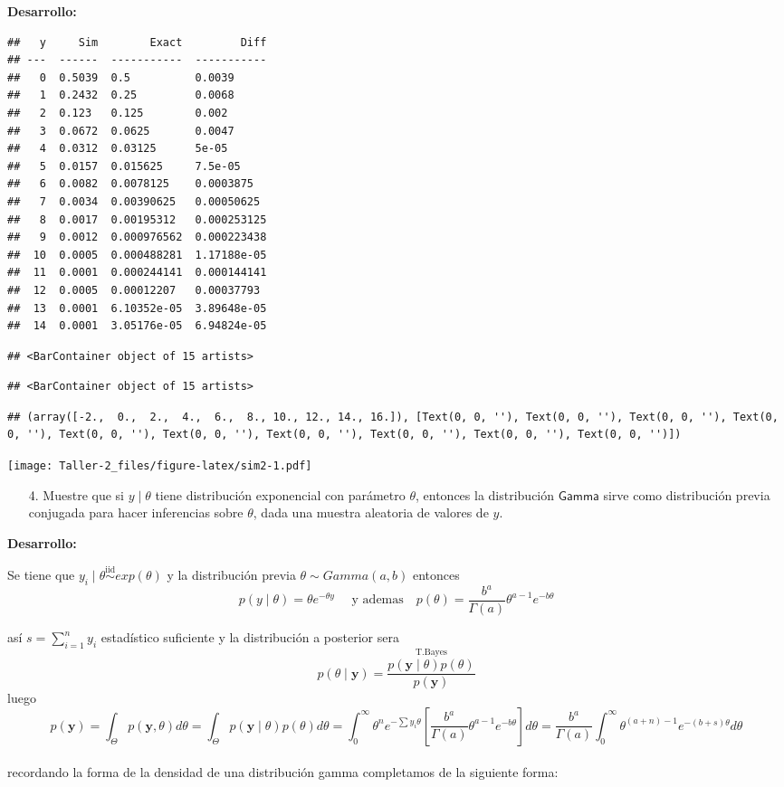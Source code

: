 \documentclass[
]{article}
\begin{document}
\textbf{Desarrollo:}

\begin{verbatim}
##   y     Sim        Exact         Diff
## ---  ------  -----------  -----------
##   0  0.5039  0.5          0.0039
##   1  0.2432  0.25         0.0068
##   2  0.123   0.125        0.002
##   3  0.0672  0.0625       0.0047
##   4  0.0312  0.03125      5e-05
##   5  0.0157  0.015625     7.5e-05
##   6  0.0082  0.0078125    0.0003875
##   7  0.0034  0.00390625   0.00050625
##   8  0.0017  0.00195312   0.000253125
##   9  0.0012  0.000976562  0.000223438
##  10  0.0005  0.000488281  1.17188e-05
##  11  0.0001  0.000244141  0.000144141
##  12  0.0005  0.00012207   0.00037793
##  13  0.0001  6.10352e-05  3.89648e-05
##  14  0.0001  3.05176e-05  6.94824e-05
\end{verbatim}

\begin{verbatim}
## <BarContainer object of 15 artists>
\end{verbatim}

\begin{verbatim}
## <BarContainer object of 15 artists>
\end{verbatim}

\begin{verbatim}
## (array([-2.,  0.,  2.,  4.,  6.,  8., 10., 12., 14., 16.]), [Text(0, 0, ''), Text(0, 0, ''), Text(0, 0, ''), Text(0, 0, ''), Text(0, 0, ''), Text(0, 0, ''), Text(0, 0, ''), Text(0, 0, ''), Text(0, 0, ''), Text(0, 0, '')])
\end{verbatim}

\texttt{[image: Taller-2\_files/figure-latex/sim2-1.pdf]}

\begin{enumerate}
  \item[4.] Muestre que si $y\mid\theta$ tiene distribución exponencial con parámetro $\theta$, entonces la distribución $\textsf{Gamma}$ sirve como distribución previa conjugada para hacer inferencias sobre $\theta$, dada una muestra aleatoria de valores de $y$.
\end{enumerate}

\textbf{Desarrollo:}

Se tiene que \(y_i\mid \theta \stackrel{\text{iid}}{\sim} exp(\theta)\)
y la distribución previa \(\theta \sim Gamma(a,b)\) entonces
\[ p(y \mid \theta)=\theta e^{-\theta y} \quad \text{ y ademas} \quad p(\theta)=\frac{b^a}{\Gamma (a)}\theta^{a-1}e^{-b\theta}\]

así \(s=\sum_{i=1}^ny_i\) estadístico suficiente y la distribución a
posterior sera
\[p(\theta \mid \boldsymbol{y}) =  \stackrel{\text{T.Bayes}}{\frac{p(\boldsymbol{y}\mid \theta)p(\theta)}{p(\boldsymbol{y})}}\]
luego
\[p(\boldsymbol{y})=\int_\Theta p(\boldsymbol{y},\theta) d\theta = \int_\Theta p(\boldsymbol{y} \mid \theta )p(\theta)d\theta =\int_0 ^\infty \theta^n e^{-\sum y_i \theta}[\frac{b^a}{\Gamma (a)}\theta^{a-1}e^{-b\theta}]d\theta=\frac{b^a}{\Gamma (a)}\int_0 ^\infty \theta^{(a+n)-1}e^{-(b+s)\theta}d\theta\]\\
recordando la forma de la densidad de una distribución gamma completamos
de la siguiente forma:
\end{document}
